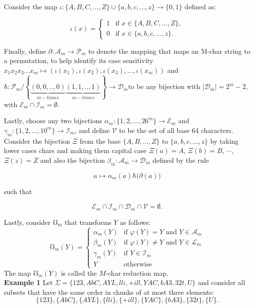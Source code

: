 \documentclass[amsmath,12pt,a4paper]{amsart}
\begin{document}
Consider the map $\iota : \{A, B, C, \dots, Z\} \cup \{a, b, c, \dots, z\} \to \{0, 1\}$ defined as:

$$
\iota(x) = \begin{cases} 
1 & \text{if } x \in \{A, B, C, \dots, Z\}, \\
0 & \text{if } x \in \{a, b, c, \dots, z\}.
\end{cases}
$$

Finally, define $\partial : \mathcal{A}_m \to \mathcal{P}_m$ to denote the mapping that maps an M-char string to a permutation, to help identify its case sensitivity $x_1x_2x_3 \dots x_m \mapsto \left( \iota(x_1), \iota(x_2), \iota(x_3), \dots, \iota(x_m) \right)$ and $
\hbar : \mathcal{P}_m / \left\{\underbrace{(0,0,..,0)}_{m-times}\underbrace{(1,1,..,1)}_{m-times}\right\} \to \mathcal{D}_m
$to be any bijection with $|\mathcal{D}_m| = 2^m - 2$, with $\mathcal{E}_m \cap \mathcal{I}_m = \emptyset$. 

Lastly, choose any two bijections $\alpha_m : \{1, 2, \dots, 26^m\} \to \mathcal{E}_m$ and $\gamma_m : \{1, 2, \dots, 10^m\} \to \mathcal{I}_m$, and define $\mathcal{V}$ to be the set of all base 64 characters. Consider the bijection $\Xi$ from the base $\{A, B, \dots, Z\}$ to $\{a, b, c, \dots, z\}$ by taking lower cases chars and making them capital case $
\Xi(a) = A$, $\Xi(b) = B$, $\cdots$, $\Xi(z) = Z$ and also the bijection $\beta_m : \mathcal{A}_m \to \mathcal{D}_m$ defined by the rule

$$
a \mapsto \alpha_m(a)\hbar\biggl(\partial (a)\biggr) 
$$

such that

$$
\mathcal{E}_m \cap \mathcal{I}_m \cap \mathcal{D}_m \cap \mathcal{V} = \emptyset.
$$

Lastly, consider $\mho_m$ that transforms $Y$ as follows:
$$
\mho_m(Y) =
\begin{cases}
\alpha_m(Y) & \text{if } \varphi(Y) = Y \text{ and } Y \in \mathcal{A}_m \\
\beta_m(Y)  & \text{if } \varphi(Y) \neq Y \text{ and } Y \in \mathcal{L}_m \\
\gamma_m(Y) & \text{if } Y \in \mathcal{I}_m \\
Y           & \text{otherwise}
\end{cases}
$$
The map $\mho_m(Y)$ is called the $M$-char reduction map.\\

\textbf{Example 1} Let $\Sigma = \{123, AbC, AY L, lli, +ill, Y AC, bA3, 32t, U\}$ and consider all subsets that have the same order in chunks of at most three elements:
$$
\{123\}, \{AbC\}, \{AY L\}, \{lli\}, \{+ill\}, \{Y AC\}, \{bA3\}, \{32t\}, \{U\}.
$$
\end{document}
